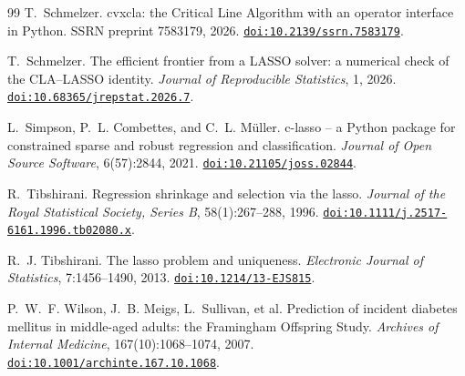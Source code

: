 \documentclass[11pt]{article}
\theoremstyle{remark}
\begin{document}
\begin{thebibliography}{99}
T.~Schmelzer.
\newblock cvxcla: the Critical Line Algorithm with an operator interface in Python.
\newblock SSRN preprint 7583179, 2026.
\newblock \href{https://doi.org/10.2139/ssrn.7583179}{\texttt{doi:10.2139/ssrn.7583179}}.


T.~Schmelzer.
\newblock The efficient frontier from a LASSO solver: a numerical check of the
CLA--LASSO identity.
\newblock \emph{Journal of Reproducible Statistics}, 1, 2026.
\newblock \href{https://doi.org/10.68365/jrepstat.2026.7}{\texttt{doi:10.68365/jrepstat.2026.7}}.


L.~Simpson, P.~L. Combettes, and C.~L. M\"uller.
\newblock c-lasso -- a {P}ython package for constrained sparse and robust regression and
classification.
\newblock \emph{Journal of Open Source Software}, 6(57):2844, 2021.
\newblock \href{https://doi.org/10.21105/joss.02844}{\texttt{doi:10.21105/joss.02844}}.

R.~Tibshirani.
\newblock Regression shrinkage and selection via the lasso.
\newblock \emph{Journal of the Royal Statistical Society, Series B}, 58(1):267--288,
1996.
\newblock \href{https://doi.org/10.1111/j.2517-6161.1996.tb02080.x}{\texttt{doi:10.1111/j.2517-6161.1996.tb02080.x}}.

R.~J. Tibshirani.
\newblock The lasso problem and uniqueness.
\newblock \emph{Electronic Journal of Statistics}, 7:1456--1490, 2013.
\newblock \href{https://doi.org/10.1214/13-EJS815}{\texttt{doi:10.1214/13-EJS815}}.

P.~W.~F. Wilson, J.~B. Meigs, L.~Sullivan, et al.
\newblock Prediction of incident diabetes mellitus in middle-aged adults: the
{F}ramingham {O}ffspring {S}tudy.
\newblock \emph{Archives of Internal Medicine}, 167(10):1068--1074, 2007.
\newblock \href{https://doi.org/10.1001/archinte.167.10.1068}{\texttt{doi:10.1001/archinte.167.10.1068}}.


\end{thebibliography}
\end{document}
